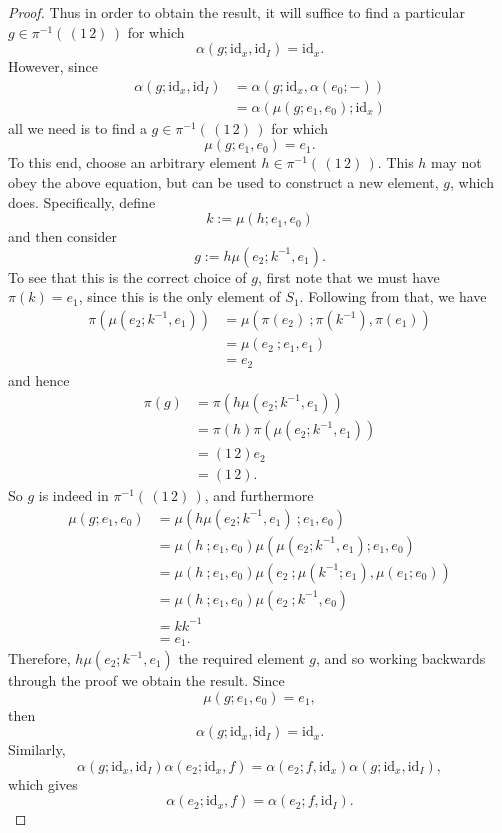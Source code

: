 \documentclass{amsbook} %
\newcommand{\id}{\textrm{id}}
\numberwithin{section}{chapter}
\begin{document}
\begin{proof}
Thus in order to obtain the result, it will suffice to find a particular $g \in \pi^{-1}( \, (1 \, 2) \, )$ for which
  \[
    \alpha(g; \id_x, \id_I) = \id_x.
  \]
However, since
  \begin{align*}
  		\alpha(  g  ;  \id_x,  \id_I  ) &= \alpha(  g  ;  \id_x,  \alpha( e_0; - )  ) \\
  		&= \alpha(  \mu(g; e_1, e_0)  ;  \id_x  )
		\end{align*}
all we need is to find a $g \in \pi^{-1}( \, (1 \, 2) \, )$ for which
  \[
    \mu(g; e_1, e_0) = e_1.
  \]
To this end, choose an arbitrary element $h \in \pi^{-1}( \, (1 \, 2) \, )$. This $h$ may not obey the above equation, but can be used to construct a new element, $g$, which does. Specifically, define
  \[
    k := \mu(h; e_1, e_0 )
  \]
and then consider
  \[
    g := h\mu(e_2; k^{-1}, e_1).
  \] 
To see that this is the correct choice of $g$, first note that we must have \( \pi(k) = e_1 \), since this is the only element of $S_1$. Following from that, we have 
  \begin{align*}
  	\pi \left(  \mu(e_2; k^{-1}, e_1)  \right) &= \mu \left(  \pi(e_2) \ ;  \pi(k^{-1}),  \pi(e_1)  \right) \\
  	&= \mu \left(  e_2  \ ;  e_1,  e_1  \right) \\
  	&= e_2
  \end{align*}
and hence
  \begin{align*}
		\pi(g) &= \pi \left(h \mu(e_2; k^{-1}, e_1) \right) \\
		       &= \pi(h) \pi \left(\mu(e_2; k^{-1}, e_1) \right) \\
		       &= (1 \, 2) e_2 \\
		       &= (1 \, 2).
  \end{align*}
So $g$ is indeed in $\pi^{-1}( \, (1 \, 2) \, )$, and furthermore
  \begin{align*}
  	\mu(g; e_1, e_0) & = \mu \left(  h \mu(e_2; k^{-1}, e_1) \ ;  e_1,  e_0  \right) \\
                  	 &= \mu(  h \ ;  e_1,  e_0  ) \mu \left(  \mu(e_2; k^{-1}, e_1) ;  e_1,  e_0   \right) \\
                  	 &= \mu(  h \ ;  e_1,  e_0  ) \mu \left(  e_2 \ ;  \mu(k^{-1}; e_1),  \mu(e_1;  e_0)  \right) \\
                  	 &= \mu(  h \ ;  e_1,  e_0  ) \mu(  e_2 \ ;  k^{-1}, e_0  ) \\
                  	 &= k k^{-1} \\
                  	 &= e_1.
  \end{align*}
Therefore, $h \mu(e_2; k^{-1}, e_1)$ the required element $g$, and so working backwards through the proof we obtain the result. Since
\[
  \mu(g; e_1, e_0) = e_1,
\]
then
\[
  \alpha(g;\id_x, \id_I) = \id_x.
\]
Similarly,
\[
  \alpha(g;\id_x, \id_I) \alpha(e_2; \id_x, f) = \alpha(e_2; f, \id_x) \alpha(g; \id_x, \id_I),
\]
which gives
\[
  \alpha(e_2; \id_x, f) = \alpha(e_2; f, \id_I).
\]

\end{proof} 
\end{document}

